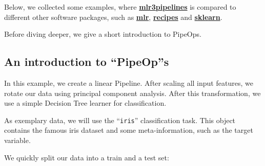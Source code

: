 \documentclass[]{scrbook}
\newenvironment{Shaded}{\begin{snugshade}}{\end{snugshade}}
\newcommand{\CommentTok}[1]{\textcolor[rgb]{0.56,0.35,0.01}{\textit{#1}}}
\newcommand{\DecValTok}[1]{\textcolor[rgb]{0.00,0.00,0.81}{#1}}
\newcommand{\KeywordTok}[1]{\textcolor[rgb]{0.13,0.29,0.53}{\textbf{#1}}}
\newcommand{\NormalTok}[1]{#1}
\newcommand{\OperatorTok}[1]{\textcolor[rgb]{0.81,0.36,0.00}{\textbf{#1}}}
\newcommand{\StringTok}[1]{\textcolor[rgb]{0.31,0.60,0.02}{#1}}
\renewenvironment{Shaded} {\begin{snugshade}\small} {\end{snugshade}}
\begin{document}
Below, we collected some examples, where \textbf{\href{https://cran.r-project.org/package=mlr3pipelines}{mlr3pipelines}} is compared to different other software packages,
such as \textbf{\href{https://cran.r-project.org/package=mlr}{mlr}}, \textbf{\href{https://cran.r-project.org/package=recipes}{recipes}} and \textbf{\href{https://scikit-learn.org/stable/}{sklearn}}.

Before diving deeper, we give a short introduction to PipeOps.

\hypertarget{an-introduction-to-pipeops}{%
\subsection{An introduction to ``PipeOp''s}\label{an-introduction-to-pipeops}}

In this example, we create a linear Pipeline.
After scaling all input features, we rotate our data using principal component analysis.
After this transformation, we use a simple Decision Tree learner for classification.

As exemplary data, we will use the ``\texttt{iris}'' classification task.
This object contains the famous iris dataset and some meta-information, such as the target variable.

\begin{Shaded}
\end{Shaded}

We quickly split our data into a train and a test set:

\begin{Shaded}
\end{Shaded}
\end{document}
